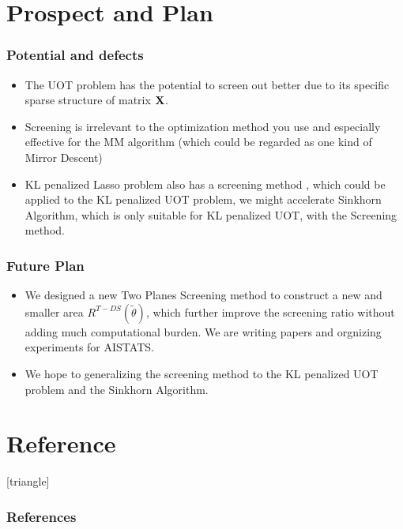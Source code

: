 \documentclass[dvipdfmx,cjk,t,10pt]{beamer}
\begin{document}
\section{Prospect and Plan}
\begin{frame}
\frametitle{Potential and defects}
	\begin{itemize}	
	\item The UOT problem has the potential to screen out better due to its specific sparse structure of matrix $\mbox{\bf X}$.
	\item Screening is irrelevant to the optimization method you use and especially effective for the MM algorithm (which could be regarded as one kind of Mirror Descent)
	\item KL penalized Lasso problem also has a screening method \cite{9414183}, which could be applied to the KL penalized UOT problem, we might accelerate Sinkhorn Algorithm, which is only suitable for KL penalized UOT, with the Screening method. 
	\end{itemize}	
\end{frame}

\begin{frame}
\frametitle{Future Plan}
	\begin{itemize}
	\item We designed a new Two Planes Screening method to construct a new and smaller area $R^{T-DS}(\tilde{\theta})$, which further improve the screening ratio without adding much computational burden. We are writing papers and orgnizing experiments for AISTATS.
	\item We hope to generalizing the screening method to the KL penalized UOT problem and the Sinkhorn Algorithm.  
	\end{itemize}	
\end{frame}

\section{Reference}

\begin{frame}[allowframebreaks]
[triangle]
        \frametitle{References}
        
        
\end{frame}


\begin{frame}
	\begin{center}	
	\vspace*{1.0cm}
	
	\vsp\vsp
	\IMPB{\Large Thank you for listening. }
	\vspace*{1.0cm}
	\end{center}	
	\vspace*{-0.5cm}
\end{frame}
\end{document}
